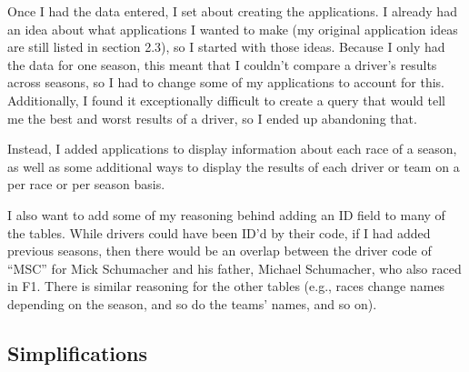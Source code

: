 \documentclass{article} %
\begin{document}
Once I had the data entered, I set about creating the applications. I
already had an idea about what applications I wanted to make (my
original application ideas are still listed in section 2.3), so I
started with those ideas. Because I only had the data for one season,
this meant that I couldn't compare a driver's results across seasons, so
I had to change some of my applications to account for this.
Additionally, I found it exceptionally difficult to create a query that
would tell me the best and worst results of a driver, so I ended up
abandoning that. 

Instead, I added applications to display information about each race of
a season, as well as some additional ways to display the results of each
driver or team on a per race or per season basis.
\medskip

I also want to add some of my reasoning behind adding an ID field to
many of the tables. While drivers could have been ID'd by their code, if
I had added previous seasons, then there would be an overlap between the
driver code of ``MSC'' for Mick Schumacher and his father, Michael
Schumacher, who also raced in F1. There is similar reasoning for the
other tables (e.g., races change names depending on the season, and so
do the teams' names, and so on).

\subsection{Simplifications}
\end{document}
